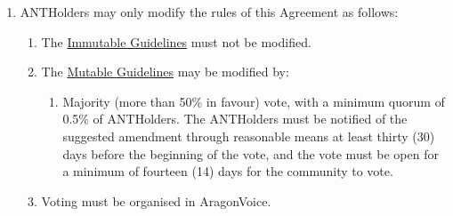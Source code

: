 \begin{enumerate}
\begin{enumerate}
		\begin{enumerate}
			
			\item \glspl{ANTHolder} may only modify the rules of this Agreement as follows:
			\begin{enumerate}
				\item The \hyperref[sec:ImmutableGuidelines]{Immutable Guidelines} must not be modified.
				\item The \hyperref[sec:MutableGuidelines]{Mutable Guidelines} may be modified by:
				\begin{enumerate}
					\item Majority (more than 50\% in favour) vote, with a minimum quorum of 0.5\% of \glspl{ANTHolder}.
					The \glspl{ANTHolder} must be notified of the suggested amendment through reasonable means at least thirty (30) days before the beginning of the vote, and the vote must be open for a minimum of fourteen (14) days for the community to vote.
				\end{enumerate}
				\item  Voting must be organised in \gls{AragonVoice}.
			\end{enumerate}
		
		\end{enumerate}
	
	\end{enumerate}

\end{enumerate}
